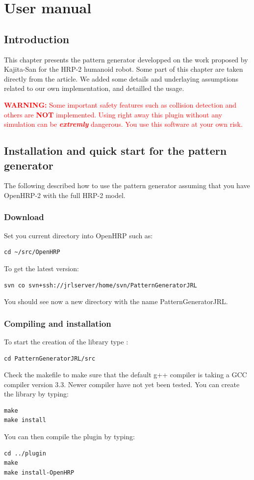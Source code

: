 \chapter{User manual}

\section{Introduction}
This chapter presents the pattern generator developped on the work proposed by Kajita-San \cite{Kajita2003}
for the HRP-2 humanoid robot.
Some part of this chapter are taken directly from the article.
We added some details and underlaying assumptions related to our own implementation, and detailled the usage.
\par
\textcolor{red}{\textbf{WARNING:} Some important safety features such as collision detection and others are \textbf{NOT}
implemented. Using right away this plugin without any simulation can be \textbf{\textit{extremly}}
dangerous. You use this software at your own risk.}

\section{Installation and quick start for the pattern generator}

The following described how to use the pattern generator assuming that you have OpenHRP-2 with the full
HRP-2 model.

\subsection{Download}
Set you current directory into OpenHRP such as:
\begin{verbatim}
cd ~/src/OpenHRP
\end{verbatim}
To get the latest version:
\begin{verbatim}
svn co svn+ssh://jrlserver/home/svn/PatternGeneratorJRL
\end{verbatim}
You should see now a new directory with the name PatternGeneratorJRL.

\subsection{Compiling and installation}
To start the creation of the library type :
\begin{verbatim}
cd PatternGeneratorJRL/src
\end{verbatim}
Check the makefile to make sure that the default g++ compiler is taking
a GCC compiler version 3.3. Newer compiler have not yet been tested.
You can create the library by typing:
\begin{verbatim}
make
make install
\end{verbatim}
You can then compile the plugin by typing:
\begin{verbatim}
cd ../plugin
make
make install-OpenHRP
\end{verbatim}

